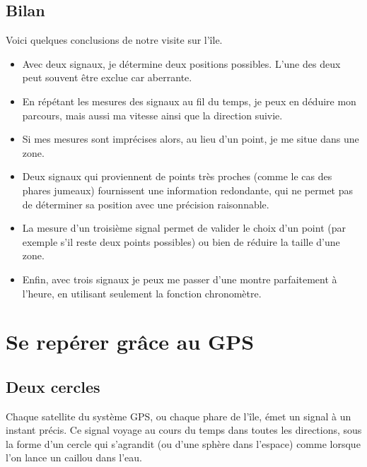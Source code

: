 \documentclass[class=report,crop=false]{standalone}
\begin{document}
\subsection{Bilan}

Voici quelques conclusions de notre visite sur l'île.

\begin{itemize}
  \item  Avec deux signaux, je détermine deux positions possibles. L'une des deux peut souvent
  être exclue car aberrante.
  
  \item En répétant les mesures des signaux au fil du temps, je peux en déduire
  mon parcours, mais aussi ma vitesse ainsi que la direction suivie.
  
  \item Si mes mesures sont imprécises alors, au lieu d'un point, je me situe dans une zone.
  
  \item Deux signaux qui proviennent de points très proches (comme le cas des phares jumeaux) 
  fournissent une information redondante, qui ne permet pas de déterminer sa position avec une précision raisonnable.
    
  \item La mesure d'un troisième signal permet de valider le choix d'un point (par exemple s'il reste deux points possibles)
  ou bien de réduire la taille d'une zone.
  
  \item Enfin, avec trois signaux je peux me passer d'une montre parfaitement à l'heure, 
  en utilisant seulement la fonction chronomètre.

  
\end{itemize}



\section{Se repérer grâce au GPS}

\subsection{Deux cercles}

Chaque satellite du système GPS, ou chaque phare de l'île, émet un signal à un instant précis.
Ce signal voyage  au cours du temps dans toutes les directions, 
sous la forme d'un cercle qui s'agrandit (ou d'une sphère dans l'espace)
comme lorsque l'on lance un caillou dans l'eau.
\end{document}
